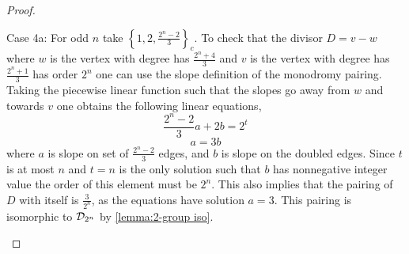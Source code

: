 \documentclass{amsart}
\begin{document}
\begin{proof}
\begin{center}
\begin{tikzpicture}
\end{tikzpicture}
\end{center}
    
    Case 4a: For odd $n$ take $\left\{1, 2,
\frac{2^{n}-2}{3}\right\}_{c}$. To check that the divisor
$D=v-w$ where $w$ is the vertex with degree has $\frac{2^{n}+4}{3}$ and
$v$ is the vertex with degree has $\frac{2^{n}+1}{3}$ has order
$2^{n}$ one can use the slope definition of the monodromy pairing. Taking the piecewise linear function such that the slopes go away from $w$ and towards $v$ one
obtains the following linear equations,
\begin{equation*}
\frac{2^{n}-2}{3}a+2b=2^{t}
\end{equation*}
\begin{equation*}
a=3b
\end{equation*}
where $a$ is slope on set of $\frac{2^{n}-2}{3}$ edges, and
$b$ is slope on the doubled edges. Since $t$ is at most $n$ and $t=n$ is the only solution such that $b$ has nonnegative integer value the order of this element must be $2^{n}$. This also implies that the pairing of $D$ with itself is $\frac{3}{2^{n}}$, as the equations have solution $a=3$. This pairing is isomorphic to
$\DP$ by  \ref{lemma:2-group iso}.

\begin{center}
\end{center}
    

\end{proof}
\end{document}
